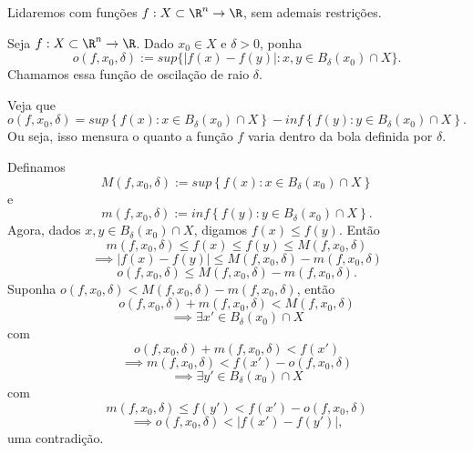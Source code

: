 Lidaremos com funções $f:X\subset \R^{n}\to \R$, sem ademais restrições.

\begin{definition}
    Seja $f:X\subset \R^{n}\to \R$. Dado $x_0\in X$ e $\delta > 0$, ponha \[
	o\left( f, x_0, \delta \right) := sup \{\left| f\left( x \right) -f\left( y \right)  \right| : x,y \in B_\delta \left( x_0 \right) \cap X\} 
    .\] Chamamos essa função de oscilação de raio  $\delta$.
\end{definition}

\begin{remark}
    Veja que \[
    o\left( f, x_0, \delta \right) = sup \left\{ f\left( x \right) : x\in B_{\delta}\left( x_0 \right) \cap X \right\}  - inf \left\{ f\left( y \right) : y\in B_\delta \left( x_0 \right) \cap X \right\} 
    .\] Ou seja, isso mensura o quanto a função $f$ varia dentro da bola definida por $\delta$.

    Definamos \[
    M\left( f, x_0, \delta \right) := sup \left\{ f\left( x \right) : x\in B_{\delta}\left( x_0 \right) \cap X \right\}
    \] e \[
    m\left( f, x_0, \delta \right) := inf \left\{ f\left( y \right) : y\in B_\delta \left( x_0 \right) \cap X \right\} 
    .\] Agora, dados $x, y \in  B_\delta \left( x_0 \right) \cap X$, digamos $f\left( x \right) \le f\left( y \right) $. Então \[
    m\left( f,x_0,\delta \right) \le f\left( x \right) \le f\left( y \right) \le M\left( f,x_0,\delta \right) 
    \] \[
    \implies \left| f\left( x \right) -f\left( y \right)  \right| \le M\left( f,x_0,\delta \right) - m\left( f,x_0,\delta \right)
    \] \[
    o\left( f,x_0,\delta \right) \le M\left( f,x_0,\delta \right) - m\left( f,x_0,\delta \right)
    .\] Suponha $o\left( f,x_0,\delta \right) < M\left( f,x_0,\delta \right)-m\left( f,x_0,\delta \right)$, então \[
    o\left( f,x_0,\delta \right) + m\left( f,x_0,\delta \right) < M\left( f,x_0,\delta \right)
    \] \[
    \implies \exists x' \in B_\delta \left( x_0 \right) \cap X
    \] com \[
    o\left( f,x_0,\delta \right) + m\left( f,x_0,\delta \right) < f\left( x' \right) 
    \] \[
    \implies m\left( f,x_0,\delta \right) < f\left( x' \right) -o\left( f,x_0,\delta \right)
    \] \[
    \implies \exists y' \in B_\delta \left( x_0 \right) \cap X
    \] com \[
    m\left( f,x_0,\delta \right)\le f\left( y' \right) <f\left( x' \right) -o\left( f,x_0,\delta \right)
    \] \[
    \implies o\left( f,x_0,\delta \right) < \left| f\left( x' \right) - f\left( y' \right)   \right| 
    ,\] uma contradição.
\end{remark}

